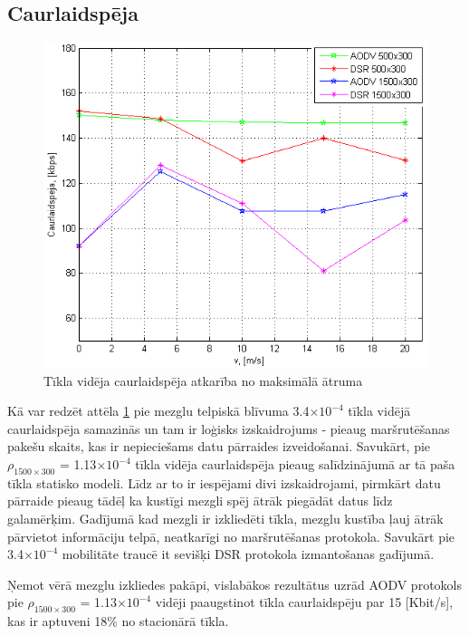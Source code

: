 \subsection{Caurlaidspēja}
\begin{figure}[!htb]
\centering
\includegraphics[scale=0.75]{./graph/vThrough.png}
\caption{Tīkla vidēja caurlaidspēja atkarība no maksimālā ātruma}
\label{fig:avgT}
\end{figure}
Kā var redzēt attēla  \ref{fig:avgT} pie mezglu telpiskā blīvuma 3.4$\times10^{-4}$ tīkla vidējā caurlaidspēja samazinās un tam ir loģisks izskaidrojums - pieaug maršrutēšanas pakešu skaits, kas ir nepieciešams datu pārraides izveidošanai. Savukārt, pie $\rho_{1500\times300}$ = 1.13$\times10^{-4}$ tīkla vidēja caurlaidspēja pieaug salīdzinājumā ar tā paša tīkla statisko modeli. Līdz ar to ir iespējami divi izskaidrojami, pirmkārt datu pārraide pieaug tādēļ ka kustīgi mezgli spēj ātrāk piegādāt datus līdz galamērķim. Gadījumā kad mezgli ir izkliedēti tīkla, mezglu kustība ļauj ātrāk pārvietot informāciju telpā, neatkarīgi no maršrutēšanas protokola. Savukārt pie 3.4$\times10^{-4}$ mobilitāte traucē it sevišķi DSR protokola izmantošanas gadījumā.

Ņemot vērā mezglu izkliedes pakāpi, vislabākos rezultātus uzrād AODV protokols pie $\rho_{1500\times300}$ = 1.13$\times10^{-4}$ vidēji paaugstinot tīkla caurlaidspēju par 15 [Kbit/s], kas ir aptuveni 18\% no stacionārā tīkla.

